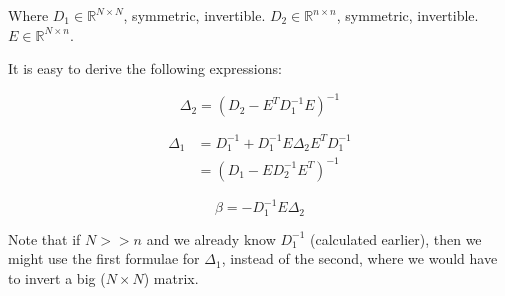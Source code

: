 \documentclass{article}
\begin{document}
Where $D_1 \in \mathbb{R}^{N\times N}$, symmetric, invertible. $D_2 \in \mathbb{R}^{n\times n}$, symmetric, invertible. $E \in \mathbb{R}^{N\times n}$.

It is easy to derive the following expressions:

\begin{equation}
    \Delta_2 = (D_2 - E^T D^{-1}_1 E)^{-1}
\end{equation}

\begin{equation}
\begin{split}
    \Delta_1 &= D^{-1}_1 + D^{-1}_1 E \Delta_2 E^T D^{-1}_1\\
    &= (D_1 - E D^{-1}_2 E^T)^{-1}
\end{split}
\end{equation}

\begin{equation}
    \beta = -D^{-1}_1 E \Delta_2
\end{equation}

Note that if $N >> n$ and we already know $D^{-1}_1$ (calculated earlier), then we might use the first formulae for $\Delta_1$, instead of the second, where we would have to invert a big ($N \times N$) matrix.
\end{document}
